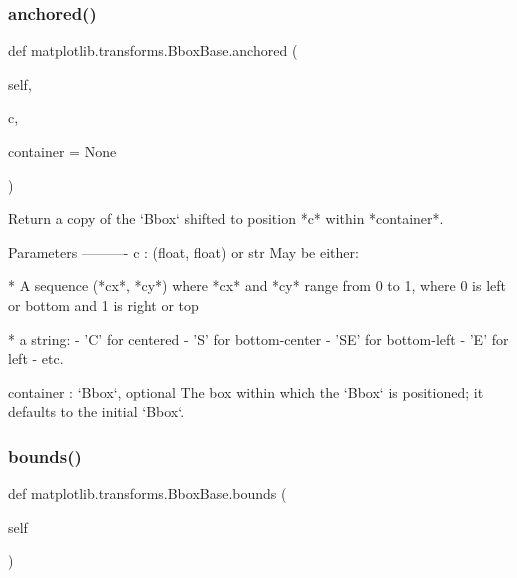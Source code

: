 \mbox{\label{classmatplotlib_1_1transforms_1_1BboxBase_af21b95e17ee0b5919defb690684ade2d}} 
\subsubsection{\texorpdfstring{anchored()}{anchored()}}
{\footnotesize\ttfamily def matplotlib.\+transforms.\+Bbox\+Base.\+anchored (\begin{DoxyParamCaption}\item[{}]{self,  }\item[{}]{c,  }\item[{}]{container = {\ttfamily None} }\end{DoxyParamCaption})}

\begin{DoxyVerb}Return a copy of the `Bbox` shifted to position *c* within *container*.

Parameters
----------
c : (float, float) or str
    May be either:

    * A sequence (*cx*, *cy*) where *cx* and *cy* range from 0
      to 1, where 0 is left or bottom and 1 is right or top

    * a string:
      - 'C' for centered
      - 'S' for bottom-center
      - 'SE' for bottom-left
      - 'E' for left
      - etc.

container : `Bbox`, optional
    The box within which the `Bbox` is positioned; it defaults
    to the initial `Bbox`.
\end{DoxyVerb}
 \mbox{\label{classmatplotlib_1_1transforms_1_1BboxBase_a40f28fe572af6ed7412d2e436910614e}} 
\subsubsection{\texorpdfstring{bounds()}{bounds()}}
{\footnotesize\ttfamily def matplotlib.\+transforms.\+Bbox\+Base.\+bounds (\begin{DoxyParamCaption}\item[{}]{self }\end{DoxyParamCaption})}


